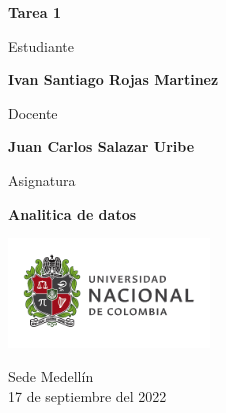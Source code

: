 \begin{titlepage}
   \Large{
   \begin{center}
       \vspace*{1cm}

       \textbf{Tarea 1}

            
       \vspace{1.1cm}
       
       Estudiante
       
       \vspace{0.5cm}
        

       \textbf{Ivan Santiago Rojas Martinez} \\



       \vspace{1cm}
       
       Docente
       
       \vspace{0.5cm}

       \textbf{Juan Carlos Salazar Uribe}
       
       \vspace{0.4cm}

       \vspace{1.4cm}
       
       Asignatura
       
       \vspace{0.5cm}

       \textbf{Analitica de datos}

       \vfill

            
       \vspace{0.4cm}
     
       \includegraphics[width=0.4\textwidth]{DocumentFormat/logounal.png}
            
       Sede Medellín\\
       17 de septiembre del 2022
       
   \end{center}
   }
\end{titlepage}